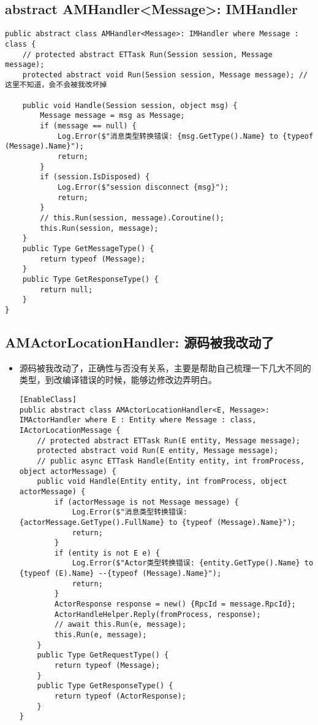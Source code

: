 \documentclass[9pt, b5paper]{article}
\begin{document}
\subsection{abstract AMHandler<Message>: IMHandler}
\label{sec-10-3}
\begin{verbatim}
public abstract class AMHandler<Message>: IMHandler where Message : class {
    // protected abstract ETTask Run(Session session, Message message);
    protected abstract void Run(Session session, Message message); // 这里不知道，会不会被我改坏掉

    public void Handle(Session session, object msg) {
        Message message = msg as Message;
        if (message == null) {
            Log.Error($"消息类型转换错误: {msg.GetType().Name} to {typeof (Message).Name}");
            return;
        }
        if (session.IsDisposed) {
            Log.Error($"session disconnect {msg}");
            return;
        }
        // this.Run(session, message).Coroutine();
        this.Run(session, message);
    }
    public Type GetMessageType() {
        return typeof (Message);
    }
    public Type GetResponseType() {
        return null;
    }
}
\end{verbatim}
\subsection{AMActorLocationHandler: 源码被我改动了}
\label{sec-10-4}
\begin{itemize}
\item 源码被我改动了，正确性与否没有关系，主要是帮助自己梳理一下几大不同的类型，到改编译错误的时候，能够边修改边弄明白。
\begin{verbatim}
[EnableClass]
public abstract class AMActorLocationHandler<E, Message>: IMActorHandler where E : Entity where Message : class, IActorLocationMessage {
    // protected abstract ETTask Run(E entity, Message message);
    protected abstract void Run(E entity, Message message);
    // public async ETTask Handle(Entity entity, int fromProcess, object actorMessage) {
    public void Handle(Entity entity, int fromProcess, object actorMessage) {
        if (actorMessage is not Message message) {
            Log.Error($"消息类型转换错误: {actorMessage.GetType().FullName} to {typeof (Message).Name}");
            return;
        }
        if (entity is not E e) {
            Log.Error($"Actor类型转换错误: {entity.GetType().Name} to {typeof (E).Name} --{typeof (Message).Name}");
            return;
        }
        ActorResponse response = new() {RpcId = message.RpcId};
        ActorHandleHelper.Reply(fromProcess, response);
        // await this.Run(e, message);
        this.Run(e, message);
    }
    public Type GetRequestType() {
        return typeof (Message);
    }
    public Type GetResponseType() {
        return typeof (ActorResponse);
    }
}
\end{verbatim}
\end{itemize}
\end{document}
